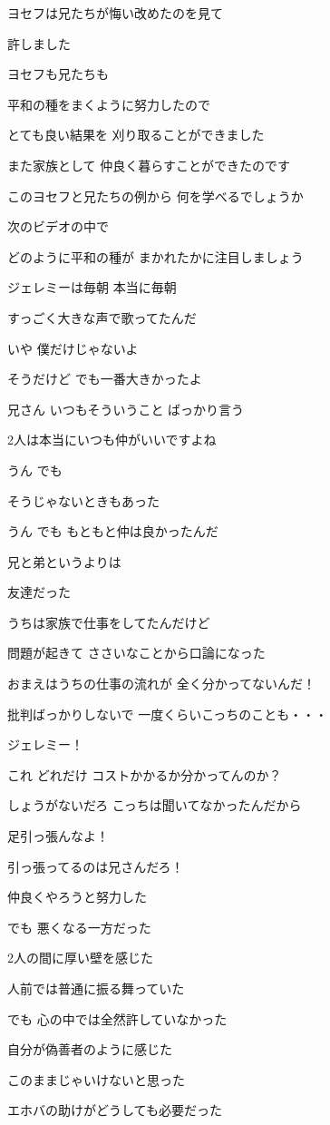 \documentclass[twocolumn]{jsarticle}
\begin{document}
ヨセフは兄たちが悔い改めたのを見て

許しました

ヨセフも兄たちも

平和の種をまくように努力したので

とても良い結果を
刈り取ることができました

また家族として
仲良く暮らすことができたのです

このヨセフと兄たちの例から
何を学べるでしょうか

次のビデオの中で

どのように平和の種が
まかれたかに注目しましょう

ジェレミーは毎朝 本当に毎朝

すっごく大きな声で歌ってたんだ

いや 僕だけじゃないよ

そうだけど でも一番大きかったよ

兄さん いつもそういうこと
ばっかり言う

2人は本当にいつも仲がいいですよね

うん でも

そうじゃないときもあった

うん でも もともと仲は良かったんだ

兄と弟というよりは

友達だった

うちは家族で仕事をしてたんだけど

問題が起きて
ささいなことから口論になった

おまえはうちの仕事の流れが
全く分かってないんだ！

批判ばっかりしないで
一度くらいこっちのことも・・・

ジェレミー！

これ どれだけ
コストかかるか分かってんのか？

しょうがないだろ
こっちは聞いてなかったんだから

足引っ張んなよ！

引っ張ってるのは兄さんだろ！

仲良くやろうと努力した

でも 悪くなる一方だった

2人の間に厚い壁を感じた

人前では普通に振る舞っていた

でも 心の中では全然許していなかった

自分が偽善者のように感じた

このままじゃいけないと思った

エホバの助けがどうしても必要だった
\end{document}

